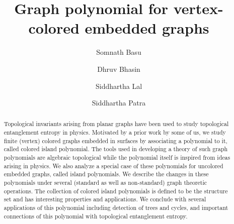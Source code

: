 \documentclass[10pt, reqno]{amsart}
\theoremstyle{plain}
\theoremstyle{remark}
\theoremstyle{definition}
\numberwithin{equation}{section}
\begin{document}
\vspace*{-0.3cm}
\title{Graph polynomial for vertex-colored embedded graphs}

\author{Somnath Basu}
\address{Department of Mathematics \& Statistics, Indian Institute of Science Education \& Research, Mohanpur 741246, West Bengal, India}

\author{Dhruv Bhasin}
\address{Department of Mathematical Sciences, Indian Institute of Science Education and Research Pune, Maharashtra - 411008, India}

\author{Siddhartha Lal}
\address{Department of Physical Sciences, Indian Institute of Science Education \& Research, Mohanpur 741246, West Bengal, India}

\author{Siddhartha Patra}
\address{Centre for Quantum Engineering, Research and Education, TCG CREST, Kolkata 700091, India}

\begin{abstract}
Topological invariants arising from planar graphs have been used to study topological entanglement entropy in physics. Motivated by a prior work by some of us, we study finite (vertex) colored graphs embedded in surfaces by associating a polynomial to it, called colored island polynomial. The tools used in developing a theory of such graph polynomials are algebraic topological while the polynomial itself is inspired from ideas arising in physics. We also analyze a special case of these polynomials for uncolored embedded graphs, called island polynomials. We describe the changes in these polynomials under several (standard as well as non-standard) graph theoretic operations. The collection of colored island polynomials is defined to be the structure set and has interesting properties and applications. We conclude with several applications of this polynomial including detection of trees and cycles, and important connections of this polynomial with topological entanglement entropy. 
\end{abstract}

\maketitle

\renewcommand{\baselinestretch}{0.6}\normalsize
\tableofcontents
\renewcommand{\baselinestretch}{1.0}\normalsize
\end{document}
